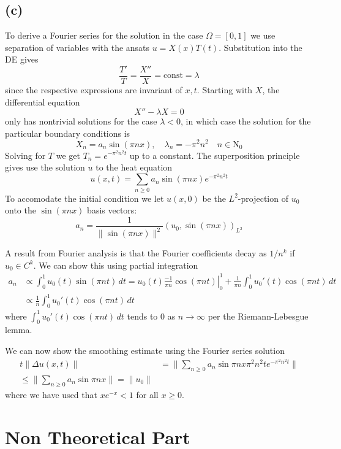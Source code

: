 \documentclass{article}
\begin{document}
\subsection{(c)}

To derive a Fourier series for the solution in the case $\Omega = [0, 1]$
we use separation of variables with the ansats $u = X(x)T(t)$.
Substitution into the DE gives
$$ \frac{T'}T = \frac{X''}X = \text{const} = \lambda $$
since the respective expressions are invariant of $x, t$.
Starting with $X$, the differential equation
$$ X'' - \lambda X = 0 $$
only has nontrivial solutions for the case $\lambda<0$,
in which case the solution for the particular boundary conditions is
$$ X_n = a_n \sin(\pi n x), \quad \lambda_n = -\pi^2 n^2 \quad n \in \mathrm N_0 $$
Solving for $T$ we get $T_n = e^{-\pi^2 n^2 t}$ up to a constant.
The superposition principle gives use the solution $u$ to the heat equation
$$ u(x, t) = \sum_{n \ge 0} a_n \sin(\pi n x) e^{-\pi^2 n^2 t} $$
To accomodate the initial condition we let $u(x, 0)$
be the $L^2$-projection of $u_0$ onto the $\sin(\pi n x)$ basis vectors:
$$ a_n = \frac1{\lVert \sin(\pi n x) \rVert^2} (u_0, \sin(\pi n x))_{L^2} $$

A result from Fourier analysis is that the Fourier coefficients
decay as $1/n^k$ if $u_0 \in C^k$.
We can show this using partial integration
\begin{align*}
  a_n &\propto \int_0^1 u_0(t) \sin(\pi n t) \, dt
  = \left. u_0(t) \frac{-1}{\pi n} \cos(\pi n t) \right\vert_0^1
  + \frac1{\pi n} \int_0^1 u_0'(t) \cos(\pi n t) \, dt \\
  &\propto \frac1n \int_0^1 u_0'(t) \cos(\pi n t) \, dt
\end{align*}
where $\int_0^1 u_0'(t) \cos(\pi n t) \, dt$
tends to $0$ as $n \to \infty$ per the Riemann-Lebesgue lemma.

We can now show the smoothing estimate using the Fourier series solution
\begin{align*}
  t \lVert \Delta u(x, t) \rVert &= \lVert \sum_{n \ge 0} a_n \sin{\pi n x} \pi^2 n^2 t e^{-\pi^2 n^2 t} \rVert \\
  \le \lVert \sum_{n \ge 0} a_n \sin{\pi n x} \rVert = \lVert u_0 \rVert
\end{align*}
where we have used that $x e^{-x} < 1$ for all $x \ge 0$.

\section{Non Theoretical Part}
\end{document}
